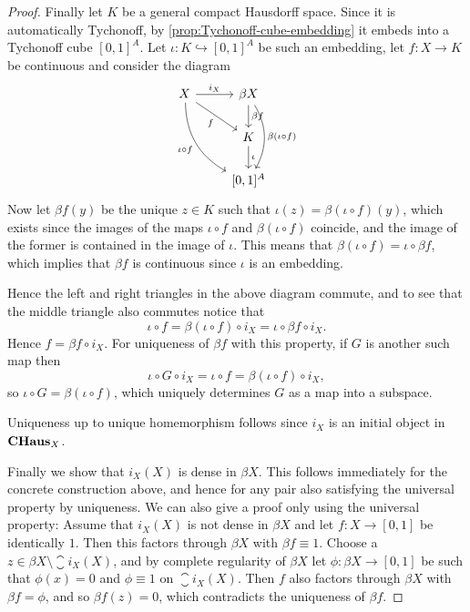 \documentclass[article, a4paper, 11pt, oneside]{memoir}
\numberwithin{equation}{chapter}
\begin{document}
\begin{proof}
    Finally let $K$ be a general compact Hausdorff space. Since it is automatically Tychonoff, by \cref{prop:Tychonoff-cube-embedding} it embeds into a Tychonoff cube $[0,1]^A$. Let $\iota \colon K \hookrightarrow [0,1]^A$ be such an embedding, let $f \colon X \to K$ be continuous and consider the diagram
    \begin{equation*}
        \begin{tikzcd}
            X
                \ar[r, "i_X"]
                \ar[dr, "f", swap]
                \ar[ddr, "\iota \circ f", swap, bend right]
            & \beta X
                \ar[d, "\beta f"]
                \ar[dd, "\beta(\iota \circ f)", bend left]
            \\
            & K
                \ar[d, "\iota"]
            \\
            & {[0,1]^A}
        \end{tikzcd}
    \end{equation*}
    Now let $\beta f(y)$ be the unique $z \in K$ such that $\iota(z) = \beta(\iota \circ f)(y)$, which exists since the images of the maps $\iota \circ f$ and $\beta(\iota \circ f)$ coincide, and the image of the former is contained in the image of $\iota$. This means that $\beta(\iota \circ f) = \iota \circ \beta f$, which implies that $\beta f$ is continuous since $\iota$ is an embedding.
    
    Hence the left and right triangles in the above diagram commute, and to see that the middle triangle also commutes notice that
    \begin{equation*}
        \iota \circ f
            = \beta(\iota \circ f) \circ i_X
            = \iota \circ \beta f \circ i_X.
    \end{equation*}
    Hence $f = \beta f \circ i_X$. For uniqueness of $\beta f$ with this property, if $G$ is another such map then
    \begin{equation*}
        \iota \circ G \circ i_X
            = \iota \circ f
            = \beta(\iota \circ f) \circ i_X,
    \end{equation*}
    so $\iota \circ G = \beta(\iota \circ f)$, which uniquely determines $G$ as a map into a subspace.

    Uniqueness up to unique homemorphism follows since $i_X$ is an initial object in $\mathbf{CHaus}_X$.

    Finally we show that $i_X(X)$ is dense in $\beta X$. This follows immediately for the concrete construction above, and hence for any pair also satisfying the universal property by uniqueness. We can also give a proof only using the universal property: Assume that $i_X(X)$ is not dense in $\beta X$ and let $f \colon X \to [0,1]$ be identically $1$. Then this factors through $\beta X$ with $\beta f \equiv 1$. Choose a $z \in \beta X \setminus \closure{i_X(X)}$, and by complete regularity of $\beta X$ let $\phi \colon \beta X \to [0,1]$ be such that $\phi(x) = 0$ and $\phi \equiv 1$ on $\closure{i_X(X)}$. Then $f$ also factors through $\beta X$ with $\beta f = \phi$, and so $\beta f(z) = 0$, which contradicts the uniqueness of $\beta f$.
\end{proof}
\end{document}
